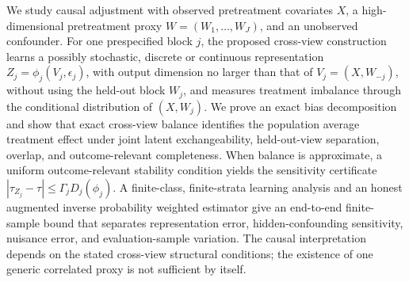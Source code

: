 We study causal adjustment with observed pretreatment covariates $X$, a high-dimensional pretreatment proxy $W=(W_1,\ldots,W_J)$, and an unobserved confounder. For one prespecified block $j$, the proposed cross-view construction learns a possibly stochastic, discrete or continuous representation $Z_j=\phi_j(V_j,\epsilon_j)$, with output dimension no larger than that of $V_j=(X,W_{-j})$, without using the held-out block $W_j$, and measures treatment imbalance through the conditional distribution of $(X,W_j)$. We prove an exact bias decomposition and show that exact cross-view balance identifies the population average treatment effect under joint latent exchangeability, held-out-view separation, overlap, and outcome-relevant completeness. When balance is approximate, a uniform outcome-relevant stability condition yields the sensitivity certificate $|\tau_{Z_j}-\tau|\le\Gamma_jD_j(\phi_j)$. A finite-class, finite-strata learning analysis and an honest augmented inverse probability weighted estimator give an end-to-end finite-sample bound that separates representation error, hidden-confounding sensitivity, nuisance error, and evaluation-sample variation. The causal interpretation depends on the stated cross-view structural conditions; the existence of one generic correlated proxy is not sufficient by itself.
